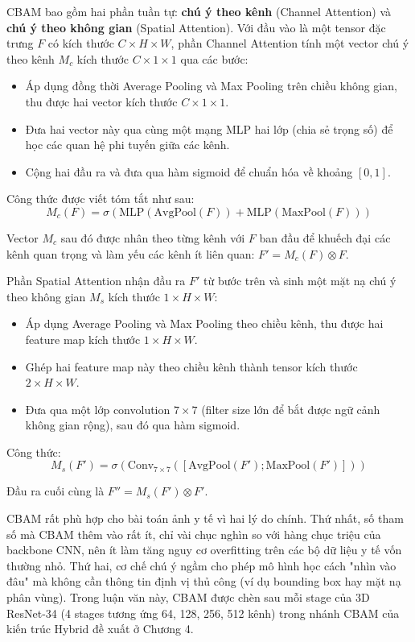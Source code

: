 CBAM bao gồm hai phần tuần tự: \textbf{chú ý theo kênh} (Channel Attention) và \textbf{chú ý theo không gian} (Spatial Attention). Với đầu vào là một tensor đặc trưng $F$ có kích thước $C \times H \times W$, phần Channel Attention tính một vector chú ý theo kênh $M_c$ kích thước $C \times 1 \times 1$ qua các bước:
\begin{itemize}
    \item Áp dụng đồng thời Average Pooling và Max Pooling trên chiều không gian, thu được hai vector kích thước $C \times 1 \times 1$.
    \item Đưa hai vector này qua cùng một mạng MLP hai lớp (chia sẻ trọng số) để học các quan hệ phi tuyến giữa các kênh.
    \item Cộng hai đầu ra và đưa qua hàm sigmoid để chuẩn hóa về khoảng $[0, 1]$.
\end{itemize}

Công thức được viết tóm tắt như sau:
\begin{equation}
M_c(F) = \sigma\left(\text{MLP}(\text{AvgPool}(F)) + \text{MLP}(\text{MaxPool}(F))\right)
\end{equation}

Vector $M_c$ sau đó được nhân theo từng kênh với $F$ ban đầu để khuếch đại các kênh quan trọng và làm yếu các kênh ít liên quan: $F' = M_c(F) \otimes F$.

Phần Spatial Attention nhận đầu ra $F'$ từ bước trên và sinh một mặt nạ chú ý theo không gian $M_s$ kích thước $1 \times H \times W$:
\begin{itemize}
    \item Áp dụng Average Pooling và Max Pooling theo chiều kênh, thu được hai feature map kích thước $1 \times H \times W$.
    \item Ghép hai feature map này theo chiều kênh thành tensor kích thước $2 \times H \times W$.
    \item Đưa qua một lớp convolution $7 \times 7$ (filter size lớn để bắt được ngữ cảnh không gian rộng), sau đó qua hàm sigmoid.
\end{itemize}

Công thức:
\begin{equation}
M_s(F') = \sigma\left(\text{Conv}_{7\times 7}\left([\text{AvgPool}(F'); \text{MaxPool}(F')]\right)\right)
\end{equation}

Đầu ra cuối cùng là $F'' = M_s(F') \otimes F'$.

CBAM rất phù hợp cho bài toán ảnh y tế vì hai lý do chính. Thứ nhất, số tham số mà CBAM thêm vào rất ít, chỉ vài chục nghìn so với hàng chục triệu của backbone CNN, nên ít làm tăng nguy cơ overfitting trên các bộ dữ liệu y tế vốn thường nhỏ. Thứ hai, cơ chế chú ý ngầm cho phép mô hình học cách "nhìn vào đâu" mà không cần thông tin định vị thủ công (ví dụ bounding box hay mặt nạ phân vùng). Trong luận văn này, CBAM được chèn sau mỗi stage của 3D ResNet-34 (4 stages tương ứng 64, 128, 256, 512 kênh) trong nhánh CBAM của kiến trúc Hybrid đề xuất ở Chương 4.


